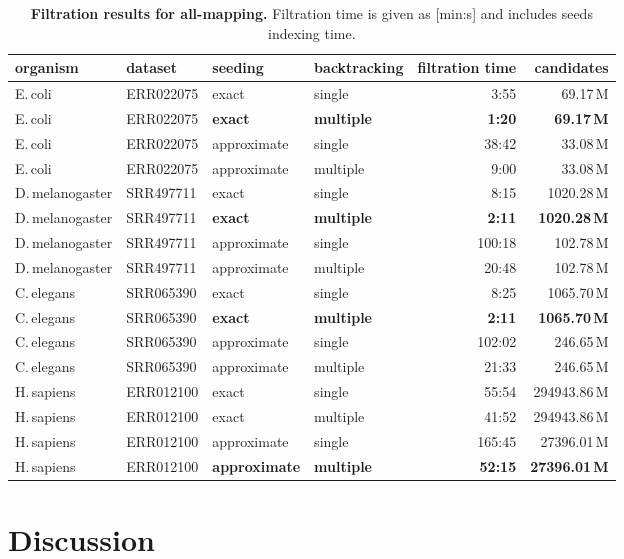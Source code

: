 \begin{table*}[h]
  \center
  \caption{
    \label{tab:Filtration}%
    \textbf{Filtration results for all-mapping.}
    Filtration time is given as [min:s] and includes seeds indexing time.
  }
  {
  \sf\footnotesize
  \begin{tabular}{llllrr}
    \toprule
	organism & dataset & seeding & backtracking & filtration time & candidates\\
    \midrule
E.\,coli & ERR022075 & exact & single & 3:55 & 69.17\,M\\
E.\,coli & ERR022075 & \textbf{exact} & \textbf{multiple} & \textbf{1:20} & \textbf{69.17\,M}\\
E.\,coli & ERR022075 & approximate & single & 38:42 & 33.08\,M\\
E.\,coli & ERR022075 & approximate & multiple & 9:00 & 33.08\,M\\
    \midrule
D.\,melanogaster & SRR497711 & exact & single & 8:15 & 1020.28\,M\\
D.\,melanogaster & SRR497711 & \textbf{exact} & \textbf{multiple} & \textbf{2:11} & \textbf{1020.28\,M}\\
D.\,melanogaster & SRR497711 & approximate & single & 100:18 & 102.78\,M\\
D.\,melanogaster & SRR497711 & approximate & multiple & 20:48 & 102.78\,M\\
    \midrule
C.\,elegans & SRR065390 & exact & single & 8:25 & 1065.70\,M\\
C.\,elegans & SRR065390 & \textbf{exact} & \textbf{multiple} & \textbf{2:11} & \textbf{1065.70\,M}\\
C.\,elegans & SRR065390 & approximate & single & 102:02 & 246.65\,M\\
C.\,elegans & SRR065390 & approximate & multiple & 21:33 & 246.65\,M\\
	\midrule
H.\,sapiens & ERR012100 & exact & single & 55:54 & 294943.86\,M\\
H.\,sapiens & ERR012100 & exact & multiple & 41:52 & 294943.86\,M\\
H.\,sapiens & ERR012100 & approximate & single & 165:45 & 27396.01\,M\\
H.\,sapiens & ERR012100 & \textbf{approximate} & \textbf{multiple} & \textbf{52:15} & \textbf{27396.01\,M}\\
    \bottomrule
  \end{tabular}
  }
  \vspace{2mm}
\end{table*}

\section{Discussion}

